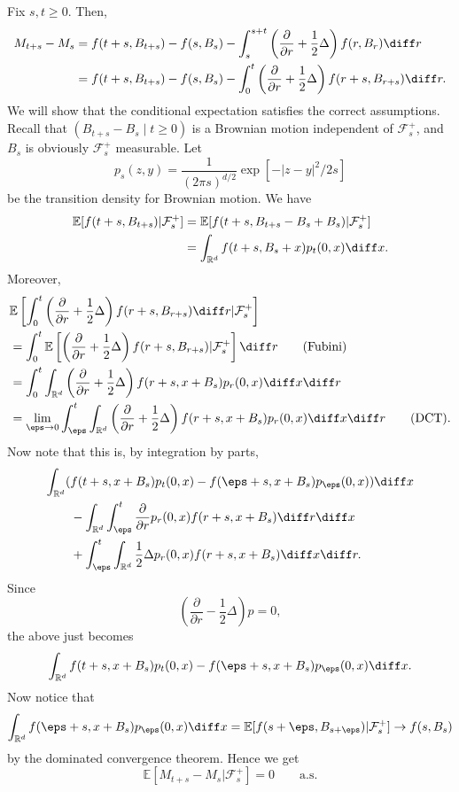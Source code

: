 \documentclass[12pt]{article}
\begin{document}
\begin{proofbox}
	Fix $s, t \geq 0$. Then,
	\begin{align*}
		M_{t+s} - M_s &= f(t+s, B_{t+s}) - f(s, B_s) - \int_{s}^{s + t} \left( \frac{\partial}{\partial r} + \frac 12 \Delta \right) f(r, B_r) \diff r \\
			      &= f(t + s, B_{t+s}) - f(s, B_s) - \int_0^t \left( \frac{\partial}{\partial r} + \frac 12 \Delta\right) f(r+s, B_{r+s}) \diff r.
	\end{align*}
	We will show that the conditional expectation satisfies the correct assumptions. Recall that $(B_{t+s} - B_s \mid t \geq 0)$ is a Brownian motion independent of $\mathcal{F}_s^+$, and $B_s$ is obviously $\mathcal{F}_s^+$ measurable. Let
	\[
		p_s(z, y) = \frac{1}{(2 \pi s)^{d/2}} \exp \left[ - |z-y|^2/2s \right]
	\]
	be the transition density for Brownian motion. We have
	\begin{align*}
		\mathbb{E}[f(t+s, B_{t+s})|\mathcal{F}_s^+] &= \mathbb{E}[f(t+s, B_{t+s}-B_s+B_s)|\mathcal{F}_s^+] \\
							    &= \int_{\mathbb{R}^d} f(t+s, B_s+x) p_t(0, x) \diff x.
	\end{align*}
	Moreover,
	\begin{align*}
		&\mathbb{E}\left[ \int_0^t \left( \frac{\partial}{\partial r} + \frac 12 \Delta \right) f(r+s, B_{r+s}) \diff r | \mathcal{F}_s^+ \right] \\
				 &= \int_0^t \mathbb{E} \left[ \left( \frac{\partial}{\partial r} + \frac 12 \Delta \right) f(r + s, B_{r+s}) |\mathcal{F}_s^+ \right] \diff r \qquad \text{(Fubini)} \\
				 &= \int_0^t \int_{\mathbb{R}^d} \left( \frac{\partial}{\partial r} + \frac 12 \Delta\right) f(r + s, x + B_s) p_r(0, x) \diff x \diff r \\
				 &= \lim_{\eps \to 0}\int_\eps^t \int_{\mathbb{R}^d} \left( \frac{\partial}{\partial r} + \frac 12 \Delta \right) f(r + s, x + B_s) p_r(0, x) \diff x \diff r \qquad \text{(DCT)}.
	\end{align*}
	Now note that this is, by integration by parts,
	\begin{align*}
		\int_{\mathbb{R}^d} (& f(t+s, x + B_s) p_t(0, x) - f(\eps + s, x + B_s) p_\eps(0, x)) \diff x \\
				     &- \int_{\mathbb{R}^d} \int_\eps^t \frac{\partial}{\partial r} p_r(0, x) f(r + s, x + B_s) \diff r \diff x \\
				     &+ \int_\eps^t \int_{\mathbb{R}^d} \frac 12 \Delta p_r(0, x) f(r + s, x + B_s) \diff x \diff r. 
	\end{align*}
	Since
	\[
	\left( \frac{\partial}{\partial r} - \frac 12 \Delta\right) p = 0,
	\]
	the above just becomes
	\[
	\int_{\mathbb{R}^d} f(t + s, x + B_s) p_t(0, x) - f(\eps + s, x + B_s) p_\eps(0, x) \diff x.
	\]
	Now notice that
	\[
	\int_{\mathbb{R}^d} f(\eps + s, x + B_s) p_\eps(0, x) \diff x = \mathbb{E}[f(s + \eps, B_{s + \eps}) | \mathcal{F}_s^+] \to f(s, B_s)
	\]
	by the dominated convergence theorem. Hence we get
	\[
		\mathbb{E}[M_{t+s} - M_s | \mathcal{F}_s^+] = 0 \qquad \text{a.s.}
	\]
	
\end{proofbox}
\end{document}
